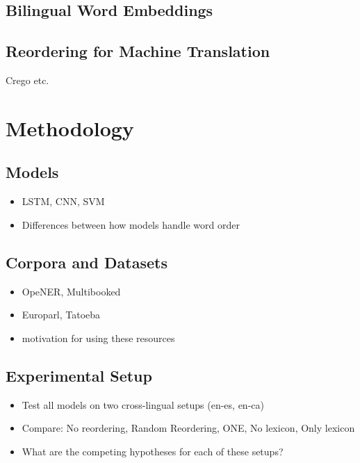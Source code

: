 \documentclass[a4paper,11pt,twocolumn,twoside]{article}
\begin{document}
\cite{Mohammad2015b}

\subsection{Bilingual Word Embeddings}

\subsection{Reordering for Machine Translation}
Crego etc.

\section{Methodology}

\subsection{Models}

\begin{itemize}
\item LSTM, CNN, SVM
\item Differences between how models handle word order
\end{itemize}

\subsection{Corpora and Datasets}

\begin{itemize}
\item OpeNER, Multibooked
\item Europarl, Tatoeba
\item motivation for using these resources
\end{itemize}

\subsection{Experimental Setup}

\begin{itemize}
\item Test all models on two cross-lingual setups (en-es, en-ca)
\item Compare: No reordering, Random Reordering, ONE, No lexicon, Only lexicon
\item What are the competing hypotheses for each of these setups?
\end{itemize}
\end{document}
